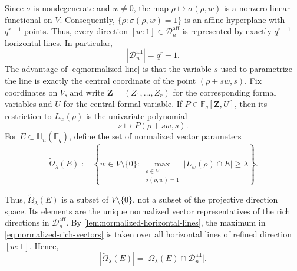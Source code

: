\documentclass[11pt,letterpaper]{amsart}
\numberwithin{equation}{section}
\theoremstyle{definition}
\theoremstyle{remark}
\newcommand{\Fq}{\mathbb F_q}
\newcommand{\HH}{\mathbb H}
\newcommand{\Dn}{\mathcal D_n}
\begin{document}
Since $\sigma$ is nondegenerate and $w\neq0$, the map
$\rho\mapsto\sigma(\rho,w)$ is a nonzero linear functional on $V$.
Consequently, $\{\rho:\sigma(\rho,w)=1\}$ is an affine hyperplane with
$q^{r-1}$ points. Thus, every direction $[w:1]\in\Dn^{\mathrm{aff}}$ is represented by exactly $q^{r-1}$ horizontal lines. In particular,
\begin{equation}\label{eq:affine-chart-cardinality}
 |\Dn^{\mathrm{aff}}|=q^r-1.
\end{equation}
The advantage of \eqref{eq:normalized-line} is that the variable $s$ used to parametrize the line is exactly the central coordinate of the point $(\rho+sw,s)$. Fix coordinates on $V$, and write
$\mathbf Z=(Z_1,\ldots,Z_r)$ for the corresponding formal variables and
$U$ for the central formal variable. If $P\in\Fq[\mathbf Z,U]$, then its restriction to $L_w(\rho)$ is the univariate polynomial
\[
 s\longmapsto P(\rho+sw,s).
\]
For $E\subset\HH_n(\Fq)$, define the set of normalized vector parameters
\begin{equation}\label{eq:normalized-rich-vectors}
 \widetilde\Omega_\lambda(E)
 :=
 \left\{w\in V\setminus\{0\}:
 \max_{\substack{\rho\in V\\\sigma(\rho,w)=1}}
 |L_w(\rho)\cap E|\geq\lambda
 \right\}.
\end{equation}


Thus, $\widetilde\Omega_\lambda(E)$ is a subset of $V\setminus\{0\}$,
not a subset of the projective direction space. Its elements are the
unique normalized vector representatives of the rich directions in
$\Dn^{\mathrm{aff}}$.
By \cref{lem:normalized-horizontal-lines}, the maximum in
\eqref{eq:normalized-rich-vectors} is taken over all horizontal lines of refined direction $[w:1]$. Hence,
\begin{equation}\label{eq:normalized-rich-cardinality}
 |\widetilde\Omega_\lambda(E)|
 =
 \bigl|\Omega_\lambda(E)\cap\Dn^{\mathrm{aff}}\bigr|.
\end{equation}
\end{document}
